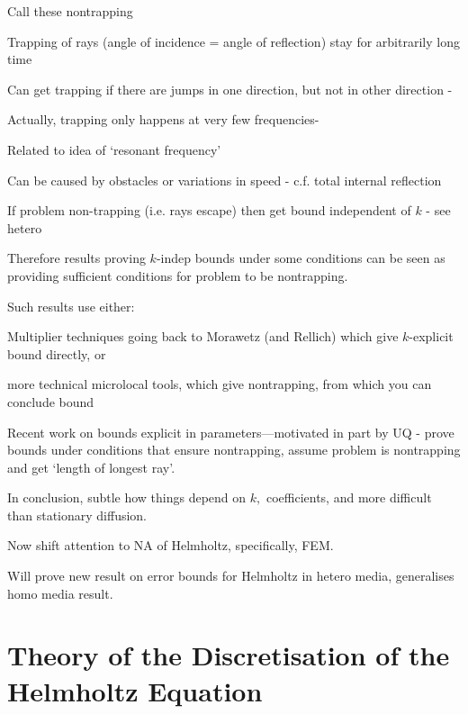   \item Call these nontrapping
\item Trapping of rays (angle of incidence = angle of reflection) stay for arbitrarily long time
\item Can get trapping if there are jumps in one direction, but not in other direction - \cite{MoSp:19}
\item Actually, trapping only happens at very few frequencies-\cite{MoSp:19,LaSpWu:19}
\item Related to idea of `resonant frequency'
\item Can be caused by obstacles or variations in speed - c.f. total internal reflection
\item If problem non-trapping (i.e. rays escape) then get bound independent of $k$ - see hetero
\item Therefore results proving $k$-indep bounds under some conditions can be seen as providing sufficient conditions for problem to be nontrapping.
\item Such results use either:
\bit
\item Multiplier techniques going back to Morawetz (and Rellich)  which give $k$-explicit bound directly, or
\item more technical microlocal tools, which give nontrapping, from which you can conclude bound
\item Recent work on bounds explicit in parameters---motivated in part by UQ - \cite{FeLiLo:15,GrPeSp:19,PeSp:18} prove bounds under conditions that ensure nontrapping, \cite{GaSpWu:18} assume problem is nontrapping and get `length of longest ray'.
\eit
\item In conclusion, subtle how things depend on $k,$ coefficients, and more difficult than stationary diffusion.
\eit

\bit
\item Now shift attention to NA of Helmholtz, specifically, FEM.
  \item Will prove new result on error bounds for Helmholtz in hetero media, generalises homo media result.
  \eit

\section{Theory of the Discretisation of the Helmholtz Equation}\label{sec:helmfe}

